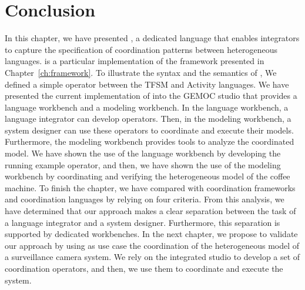 \section{Conclusion}
In this chapter, we have presented \bcool, a dedicated language that enables integrators to capture the specification of coordination patterns between heterogeneous languages. \bcool is a particular implementation of the framework presented in Chapter~\ref{ch:framework}. To illustrate the syntax and the semantics of \bcool, We defined a simple operator between the TFSM and Activity languages. We have presented the current implementation of \bcool into the GEMOC studio that provides a language workbench and a modeling workbench. In the language workbench, a language integrator can develop \bcool operators. Then, in the modeling workbench, a system designer can use these operators to coordinate and execute their models. Furthermore, the modeling workbench provides tools to analyze the coordinated model. We have shown the use of the language workbench by developing the running example operator, and then, we have shown the use of the modeling workbench by coordinating and verifying the heterogeneous model of the coffee machine. To finish the chapter, we have compared \bcool with coordination frameworks and coordination languages by relying on four criteria. From this analysis, we have determined that our approach makes a clear separation between the task of a language integrator and a system designer. Furthermore, this separation is supported by dedicated workbenches. In the next chapter, we propose to validate our approach by using as use case the coordination of the heterogeneous model of a surveillance camera system. We rely on the integrated studio to develop a set of coordination operators, and then, we use them to coordinate and execute the system. 


